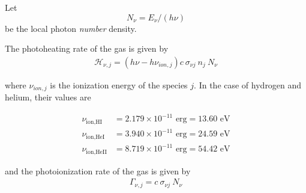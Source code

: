 Let
\begin{equation}
    N_\nu = E_\nu / (h \nu)
\end{equation}
be the local photon \emph{number} density.

The photoheating rate of the gas is given by
\begin{align}
\mathcal{H}_{\nu, j} = (h \nu - h \nu_{ion,j}) c \ \sigma_{\nu j} \ n_j \ N_\nu
\end{align}

where $\nu_{ion,j}$ is the ionization energy of the species $j$. In the case of
hydrogen and helium, their values are

\begin{align}
    \nu_{\text{ion,HI}} &= 2.179 \times 10^{-11} \text{ erg} = 13.60 \text{ eV}\\
    \nu_{\text{ion,HeI}} &= 3.940 \times 10^{-11} \text{ erg} = 24.59 \text{ eV}\\
    \nu_{\text{ion,HeII}} &= 8.719 \times 10^{-11} \text{ erg} = 54.42 \text{ eV}
\end{align}

and the photoionization rate of the gas is given by
\begin{align}
\Gamma_{\nu, j} = c \ \sigma_{\nu j} \ N_\nu
\end{align}
